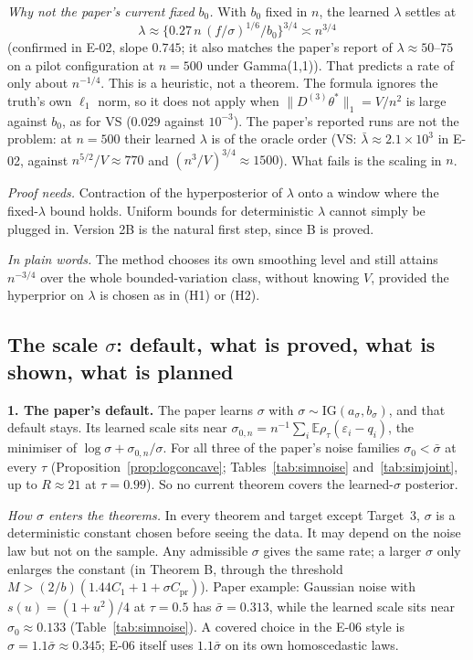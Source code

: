 \documentclass[11pt]{article}
\newcommand{\E}{\mathbb{E}}
\newcommand{\norm}[1]{\lVert #1\rVert}
\newcommand{\Dthree}{D^{(3)}}
\newcommand{\sbar}{\bar\sigma}
\theoremstyle{plain}
\theoremstyle{definition}
\theoremstyle{remark}
\newcommand{\plainly}[1]{\par\smallskip\noindent\textit{In plain words.} #1\par\smallskip}
\begin{document}
\noindent\textit{Why not the paper's current fixed $b_0$.} With $b_0$ fixed in $n$, the learned $\lambda$ settles at
\[
\lambda\approx\{0.27\,n\,(f/\sigma)^{1/6}/b_0\}^{3/4}\asymp n^{3/4}
\]
(confirmed in E-02, slope $0.745$; it also matches the paper's report of $\lambda\approx50$--$75$ on a pilot configuration at $n=500$ under Gamma(1,1)). That predicts a rate of only about $n^{-1/4}$. This is a heuristic, not a theorem. The formula ignores the truth's own $\ell_1$ norm, so it does not apply when $\norm{\Dthree\theta^*}_1=V/n^2$ is large against $b_0$, as for VS ($0.029$ against $10^{-3}$). The paper's reported runs are not the problem: at $n=500$ their learned $\lambda$ is of the oracle order (VS: $\bar\lambda\approx2.1\times10^3$ in E-02, against $n^{5/2}/V\approx770$ and $(n^3/V)^{3/4}\approx1500$). What fails is the scaling in $n$.

\noindent\textit{Proof needs.} Contraction of the hyperposterior of $\lambda$ onto a window where the fixed-$\lambda$ bound holds. Uniform bounds for deterministic $\lambda$ cannot simply be plugged in. Version 2B is the natural first step, since B is proved.

\plainly{The method chooses its own smoothing level and still attains $n^{-3/4}$ over the whole bounded-variation class, without knowing $V$, provided the hyperprior on $\lambda$ is chosen as in (H1) or (H2).}

\subsection{\texorpdfstring{The scale $\sigma$: default, what is proved, what is shown, what is planned}{The scale sigma: default, proved, shown, planned}}
\label{sec:sigma}

\noindent\textbf{1. The paper's default.} The paper learns $\sigma$ with $\sigma\sim\mathrm{IG}(a_\sigma,b_\sigma)$, and that default stays. Its learned scale sits near $\sigma_{0,n}=n^{-1}\sum_i\E\rho_\tau(\varepsilon_i-q_i)$, the minimiser of $\log\sigma+\sigma_{0,n}/\sigma$. For all three of the paper's noise families $\sigma_0<\sbar$ at every $\tau$ (Proposition~\ref{prop:logconcave}; Tables~\ref{tab:simnoise} and~\ref{tab:simjoint}, up to $R\approx21$ at $\tau=0.99$). So no current theorem covers the learned-$\sigma$ posterior.

\medskip\noindent\textit{How $\sigma$ enters the theorems.} In every theorem and target except Target~3, $\sigma$ is a deterministic constant chosen before seeing the data. It may depend on the noise law but not on the sample. Any admissible $\sigma$ gives the same rate; a larger $\sigma$ only enlarges the constant (in Theorem B, through the threshold $M>(2/b)(1.44C_1+1+\sigma C_{\mathrm{pr}})$). Paper example: Gaussian noise with $s(u)=(1+u^2)/4$ at $\tau=0.5$ has $\sbar=0.313$, while the learned scale sits near $\sigma_0\approx0.133$ (Table~\ref{tab:simnoise}). A covered choice in the E-06 style is $\sigma=1.1\sbar\approx0.345$; E-06 itself uses $1.1\sbar$ on its own homoscedastic laws.
\end{document}
